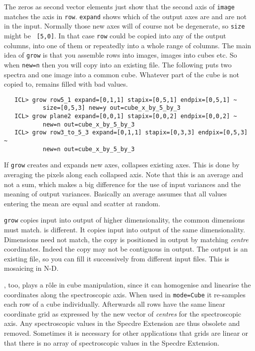    The zeros as second vector elements just show that the second axis of
   {\tt image} matches the axis in {\tt row}.  {\tt expand} shows which
   of the output axes are and are not in the input.  Normally those new
   axes will of course not be degenerate, so {\tt size} might be {\tt
   [5,0]}.  In that case {\tt row} could be copied into any of the
   output columns, into one of them or repeatedly into a whole range of
   columns.  The main idea of {\tt grow} is that you assemble rows into
   images, images into cubes etc.  So when {\tt new=n} then you will
   copy into an existing file.  The following puts two spectra and one
   image into a common cube.  Whatever part of the cube is not copied
   to, remains filled with bad values.

\begin{verbatim}
   ICL> grow row5_1 expand=[0,1,1] stapix=[0,5,1] endpix=[0,5,1] ~
           size=[0,5,3] new=y out=cube_x_by_5_by_3
   ICL> grow plane2 expand=[0,0,1] stapix=[0,0,2] endpix=[0,0,2] ~
           new=n out=cube_x_by_5_by_3
   ICL> grow row3_to_5_3 expand=[0,1,1] stapix=[0,3,3] endpix=[0,5,3] ~
           new=n out=cube_x_by_5_by_3
\end{verbatim}


   If {\tt grow} creates and expands new axes,
{\tt{}}
   collapses existing axes.  This is done by averaging the pixels along
   each collapsed axis.  Note that this is an average and not a sum,
   which makes a big difference for the use of input variances and the
   meaning of output variances.  Basically an average assumes that all
   values entering the mean are equal and scatter at random.

   {\tt grow} copies input into output of higher dimensionality, the
   common dimensions must match.
{\tt{}}
   is different.  It copies input into output of the same
   dimensionality.  Dimensions need not match, the copy is positioned in
   output by matching {\it centre} coordinates.  Indeed the copy may not
   be contiguous in output.  The output is an existing file, so you can
   fill it successively from different input files.  This is mosaicing
   in N-D.

{\tt{}},
   too, plays a r\^ole in cube manipulation, since it can homogenise and
   linearise the coordinates along the spectroscopic axis.  When used in
   {\tt mode=Cube} it re-samples each row of a cube individually.
   Afterwards all rows have the same linear coordinate grid as expressed
   by the new vector of {\it centres} for the spectroscopic axis.  Any
   spectroscopic values in the Specdre Extension are thus obsolete and
   removed.  Sometimes it is necessary for other applications that grids
   are linear or that there is no array of spectroscopic values in the
   Specdre Extension.

